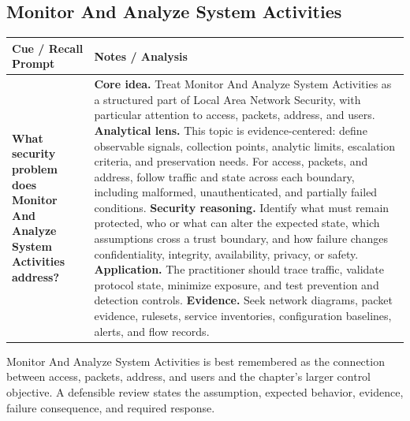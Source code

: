 \documentclass[11pt]{article}
\newcommand{\CornellHeader}{%
\rowcolor{Navy}\color{white}\bfseries Cue / Recall Prompt & \color{white}\bfseries Notes / Analysis\\\hline}
\newcommand{\CornellRow}[2]{%
\cellcolor{CueGray}\RaggedRight\textbf{#1} & \RaggedRight #2\\\hline}
\begin{document}
\subsection*{Monitor And Analyze System Activities}
\begin{longtable}{>{\RaggedRight\arraybackslash}p{}|>{\RaggedRight\arraybackslash}p{}}
\CornellHeader
\CornellRow{What security problem does Monitor And Analyze System Activities address?}{\textbf{Core idea.} Treat Monitor And Analyze System Activities as a structured part of Local Area Network Security, with particular attention to access, packets, address, and users. \textbf{Analytical lens.} This topic is evidence-centered: define observable signals, collection points, analytic limits, escalation criteria, and preservation needs. For access, packets, and address, follow traffic and state across each boundary, including malformed, unauthenticated, and partially failed conditions. \textbf{Security reasoning.} Identify what must remain protected, who or what can alter the expected state, which assumptions cross a trust boundary, and how failure changes confidentiality, integrity, availability, privacy, or safety. \textbf{Application.} The practitioner should trace traffic, validate protocol state, minimize exposure, and test prevention and detection controls. \textbf{Evidence.} Seek network diagrams, packet evidence, rulesets, service inventories, configuration baselines, alerts, and flow records.}
\end{longtable}
\begin{topicsummary}
Monitor And Analyze System Activities is best remembered as the connection between access, packets, address, and users and the chapter's larger control objective. A defensible review states the assumption, expected behavior, evidence, failure consequence, and required response.
\end{topicsummary}
\end{document}
